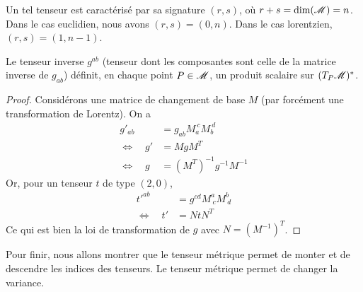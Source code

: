 \documentclass[a4paper,11pt]{report}
\begin{document}
                Un tel tenseur est caractérisé par sa signature $(r,s)$, où $r+s = \text{dim}(\mathscr{M}) = n$. Dans le cas euclidien, nous avons $(r,s) = (0,n)$. Dans le cas lorentzien, $(r,s) = (1,n-1)$.
                
                \begin{prop}\begin{leftbar}
                    Le tenseur inverse $g^{ab}$ (tenseur dont les composantes sont celle de la matrice inverse de $g_{ab}$) définit, en chaque point $P\in\mathscr{M}$, un produit scalaire sur $(T_P\mathscr{M})^*$.
                \end{leftbar}\end{prop}
                
                \begin{proof}
                    Considérons une matrice de changement de base $M$ (par forcément une transformation de Lorentz). On a
                    \begin{align}
                        g'_{ab} &= g_{ab}M_{a}^{~c}M_{b}^{~d}\\
                        \Leftrightarrow \quad g'&= MgM^T \\
                        \Leftrightarrow \quad g &= (M^T)^{-1}g^{-1}M^{-1}
                    \end{align}
                    Or, pour un tenseur $t$ de type $(2,0)$,
                    \begin{align}
                        t'^{ab} &= g^{cd}M^{a}_{~c}M^{b}_{~d}\\
                        \Leftrightarrow \quad t'&= NtN^T
                    \end{align}
                    Ce qui est bien la loi de transformation de $g$ avec $N = (M^{-1})^T$.
                \end{proof}
                
                Pour finir, nous allons montrer que le tenseur métrique permet de monter et de descendre les indices des tenseurs. Le tenseur métrique permet de changer la variance.\\
                
\end{document}
